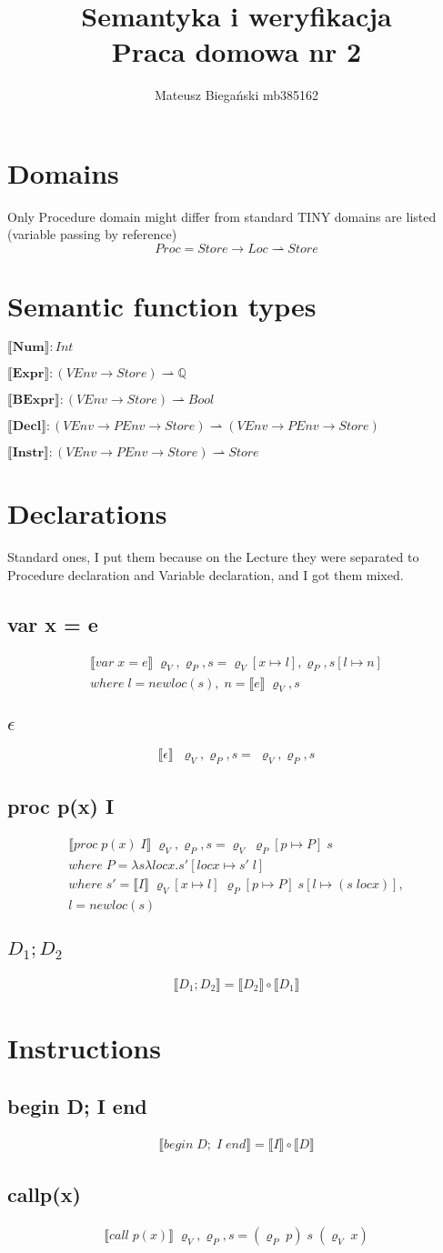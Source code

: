 \documentclass[12pt]{article}
\title{Semantyka i weryfikacja \\ Praca domowa nr 2}
\author{Mateusz Biegański mb385162}
\newcommand{\sem}[1]{\llbracket #1 \rrbracket}
\newcommand{\srod}{\;\varrho_{V}, s}
\newcommand{\srodP}{\;\varrho_{V}, \varrho_{P}, s}
\newcommand{\eq}[2]{\subsection*{#1} \begin{gather*} #2 \end{gather*}}
\begin{document}
\maketitle

\section*{Domains}
Only Procedure domain might differ from standard TINY domains are listed (variable passing by reference)
$$Proc = Store \rightarrow Loc \rightharpoonup Store$$

\section*{Semantic function types}

$\sem{\mathbf{Num}} : Int$

$\sem{\mathbf{Expr}}: (VEnv \rightarrow Store) \rightharpoonup \mathbb{Q}$

$\sem{\mathbf{BExpr}} : (VEnv \rightarrow Store) \rightharpoonup Bool$

$\sem{\mathbf{Decl}} : (VEnv \rightarrow PEnv \rightarrow Store) \rightharpoonup (VEnv \rightarrow PEnv \rightarrow Store)$

$\sem{\mathbf{Instr}} : (VEnv \rightarrow PEnv \rightarrow Store) \rightharpoonup Store$


\section*{Declarations}

Standard ones, I put them because on the Lecture they were separated to Procedure declaration and Variable declaration, and I got them mixed.

\eq {var x = e} {
	\sem{var \; x = e} \srodP = \varrho_{V}[x \mapsto l], \varrho_{P}, 
	s[l \mapsto n] \\
	where \; l = newloc(s), \; n = \sem{e} \srod
}

\eq {$\epsilon$} {
	\sem{\epsilon} \; \srodP = \srodP%
}

\eq {proc p(x) I} {
	\sem{proc \; p(x) \;I} \srodP  =  \varrho_V \; \varrho_{P}[p \mapsto P] \; s\\
	where \; P = \lambda s\lambda locx. s'[locx \mapsto s' \; l] \\
	where \; s' = \sem{I} \; \varrho_{V}[x \mapsto l] \; \varrho_{P}[p \mapsto P] \;s[l \mapsto (s \; locx)], \\
	l = newloc(s)
}


\eq {$D_1; D_2$} {
	\sem{D_1; D_2} = \sem{D_2} \circ \sem{D_1}
}


\section*{Instructions}


\eq {begin D; I end} {
	\sem{begin\;D;\;I\;end} = \sem{I} \circ \sem{D}
}

\eq {call\;p(x)} {
	\sem{call\;p(x)} \srodP = (\varrho_P \; p) \; s \; (\varrho_V \; x)
}
\end{document}
